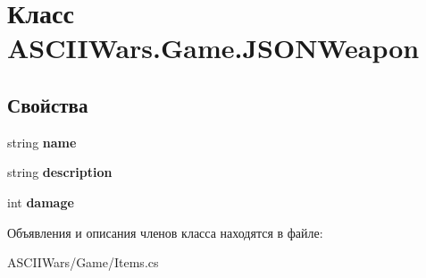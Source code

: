 \hypertarget{class_a_s_c_i_i_wars_1_1_game_1_1_j_s_o_n_weapon}{}\section{Класс A\+S\+C\+I\+I\+Wars.\+Game.\+J\+S\+O\+N\+Weapon}
\label{class_a_s_c_i_i_wars_1_1_game_1_1_j_s_o_n_weapon}
\subsection*{Свойства}
\begin{DoxyCompactItemize}
\item 
\hypertarget{class_a_s_c_i_i_wars_1_1_game_1_1_j_s_o_n_weapon_a66a5d6b4e9584f26f9b8a966ac98ddc0}{}\label{class_a_s_c_i_i_wars_1_1_game_1_1_j_s_o_n_weapon_a66a5d6b4e9584f26f9b8a966ac98ddc0} 
string {\bfseries name}
\item 
\hypertarget{class_a_s_c_i_i_wars_1_1_game_1_1_j_s_o_n_weapon_af8f05b5ec58b19bf2a2d78fade7abd40}{}\label{class_a_s_c_i_i_wars_1_1_game_1_1_j_s_o_n_weapon_af8f05b5ec58b19bf2a2d78fade7abd40} 
string {\bfseries description}
\item 
\hypertarget{class_a_s_c_i_i_wars_1_1_game_1_1_j_s_o_n_weapon_a83c928f27abae22674b84d6f17d7a07a}{}\label{class_a_s_c_i_i_wars_1_1_game_1_1_j_s_o_n_weapon_a83c928f27abae22674b84d6f17d7a07a} 
int {\bfseries damage}
\end{DoxyCompactItemize}


Объявления и описания членов класса находятся в файле\+:\begin{DoxyCompactItemize}
\item 
A\+S\+C\+I\+I\+Wars/\+Game/Items.\+cs\end{DoxyCompactItemize}
